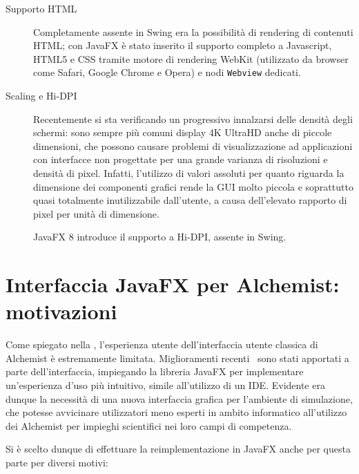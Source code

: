 \begin{description}
                \item[Supporto HTML]\label{itm:html}
                    Completamente assente in Swing era la possibilità di rendering di contenuti HTML;
                    con JavaFX è stato inserito il supporto completo a Javascript, HTML5 e CSS tramite motore di rendering WebKit (utilizzato da browser come Safari, Google Chrome e Opera) e nodi \texttt{Webview} dedicati.

                \item[Scaling e Hi-DPI]\label{itm:hidpi}
                    Recentemente si sta verificando un progressivo innalzarsi delle densità degli schermi:
                    sono sempre più comuni display 4K UltraHD anche di piccole dimensioni, che possono causare problemi di visualizzazione ad applicazioni con interfacce non progettate per una grande varianza di risoluzioni e densità di pixel.
                    Infatti, l'utilizzo di valori assoluti per quanto riguarda la dimensione dei componenti grafici rende la GUI molto piccola e soprattutto quasi totalmente inutilizzabile dall'utente, a causa dell'elevato rapporto di pixel per unità di dimensione.

                    JavaFX 8 introduce il supporto a Hi-DPI, assente in Swing.
            \end{description}

    \section{Interfaccia JavaFX per Alchemist: motivazioni}\label{sec:motivi}
        Come spiegato nella , l'esperienza utente dell'interfaccia utente classica di Alchemist è estremamente limitata.
        Miglioramenti recenti~\cite{casadio} sono stati apportati a parte dell'interfaccia, impiegando la libreria JavaFX per implementare un'esperienza d'uso più intuitivo, simile all'utilizzo di un IDE.
        Evidente era dunque la necessità di una nuova interfaccia grafica per l'ambiente di simulazione, che potesse avvicinare utilizzatori meno esperti in ambito informatico all'utilizzo dei Alchemist per impieghi scientifici nei loro campi di competenza.

        Si è scelto dunque di effettuare la reimplementazione in JavaFX anche per questa parte per diversi motivi:

